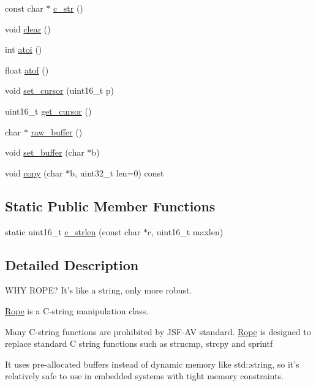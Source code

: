\begin{DoxyCompactItemize}
\item 
const char $\ast$ \hyperlink{classetk_1_1_rope_a8482418c97840cf01858cc6ca18089a9}{c\-\_\-str} ()
\item 
void \hyperlink{classetk_1_1_rope_acd34769b990ad387b86072e441972399}{clear} ()
\item 
int \hyperlink{classetk_1_1_rope_a94655941a6c83f0c11b42ef9d5963c59}{atoi} ()
\item 
float \hyperlink{classetk_1_1_rope_a3fd75a6ae84dd6c9e21cf70b08f0b3c6}{atof} ()
\item 
void \hyperlink{classetk_1_1_rope_a150e9654c3c45c4fd41dec122bb63f75}{set\-\_\-cursor} (uint16\-\_\-t p)
\item 
uint16\-\_\-t \hyperlink{classetk_1_1_rope_a6605800c26b2a0964b9c269f6cf1bd44}{get\-\_\-cursor} ()
\item 
char $\ast$ \hyperlink{classetk_1_1_rope_a1c1e6c26c734e7d89c8d54344bd010c5}{raw\-\_\-buffer} ()
\item 
void \hyperlink{classetk_1_1_rope_ad38997d446f67b330af0a84f158bcbcf}{set\-\_\-buffer} (char $\ast$b)
\item 
void \hyperlink{classetk_1_1_rope_ad75a8076c5e4ae60035150e87f623d82}{copy} (char $\ast$b, uint32\-\_\-t len=0) const 
\end{DoxyCompactItemize}
\subsection*{Static Public Member Functions}
\begin{DoxyCompactItemize}
\item 
static uint16\-\_\-t \hyperlink{classetk_1_1_rope_a7be1b040b7faf58460668fdb8b8a49c1}{c\-\_\-strlen} (const char $\ast$c, uint16\-\_\-t maxlen)
\end{DoxyCompactItemize}


\subsection{Detailed Description}
W\-H\-Y R\-O\-P\-E? It's like a string, only more robust. 

\hyperlink{classetk_1_1_rope}{Rope} is a C-\/string manipulation class.

Many C-\/string functions are prohibited by J\-S\-F-\/\-A\-V standard. \hyperlink{classetk_1_1_rope}{Rope} is designed to replace standard C string functions such as strncmp, strcpy and sprintf

It uses pre-\/allocated buffers instead of dynamic memory like std\-::string, so it's relatively safe to use in embedded systems with tight memory constraints.

